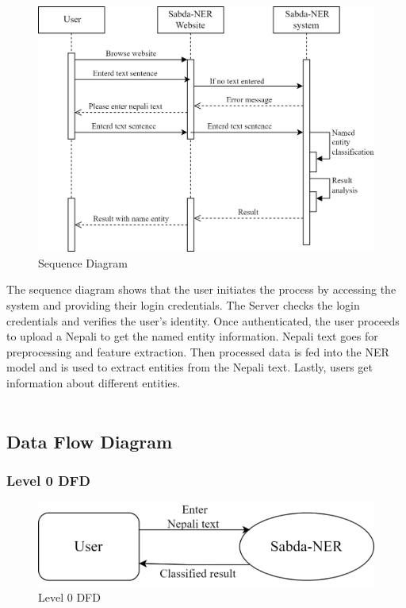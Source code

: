   \begin{figure}[H]
\centering
\includegraphics [scale=1.1]{img/systemBlock-etc/sabda ner sequence diagram.png}
\caption[ Sequence Diagram]{ Sequence Diagram}

\end{figure}

 
The sequence diagram shows that the user initiates the process by accessing the system and providing their login credentials. The Server checks the login credentials and verifies the user’s identity. Once authenticated, the user proceeds to upload a Nepali to get the named entity information. Nepali text goes for preprocessing and feature extraction. Then processed data is fed into the NER model and is used to extract entities from the Nepali text. Lastly, users get information about different entities.\\


\\

\vspace{40pt} %
\subsection{Data Flow Diagram}
\vspace{30pt} %
\subsubsection{ Level 0 DFD}


\begin{figure}[H]
\centering
\includegraphics [scale=1]{img/systemBlock-etc/_dfd 0.png}
\caption[ Level 0 DFD]{ Level 0 DFD}

\end{figure}

